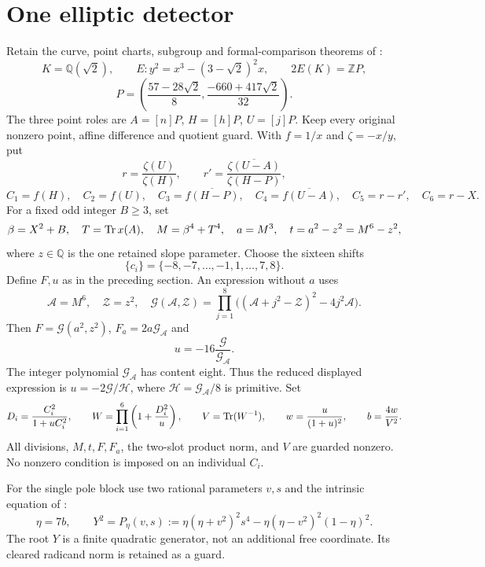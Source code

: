 \documentclass[11pt,a4paper]{article}
\newcommand{\Q}{\mathbb Q}\newcommand{\Z}{\mathbb Z}
\begin{document}
\section{One elliptic detector}

Retain the curve, point charts, subgroup and formal-comparison theorems
of \cite{Conditional,Unit}:
\[
 K=\Q(\sqrt2),\qquad E:y^2=x^3-(3-\sqrt2)^2x,\qquad
 2E(K)=\Z P,
\]
\[
 P=\left(\frac{57-28\sqrt2}{8},
          \frac{-660+417\sqrt2}{32}\right).
\]
The three point roles are $A=[n]P$, $H=[h]P$, $U=[j]P$.
Keep every original nonzero point, affine difference and quotient guard.
With $f=1/x$ and $\zeta=-x/y$, put
\[
 r=\frac{\zeta(U)}{\zeta(H)},\qquad
 r'=\overline{\frac{\zeta(U-A)}{\zeta(H-P)}},
\]
\[
 C_1=f(H),\quad C_2=f(U),\quad
 C_3=\overline{f(H-P)},\quad C_4=\overline{f(U-A)},\quad
 C_5=r-r',\quad C_6=r-X.
\]
For a fixed odd integer $B\ge3$, set
\begin{equation}\label{eq:scale}
 \beta=X^2+B,\quad T=\operatorname{Tr} x(A),\quad
 M=\beta^4+T^4,\quad a=M^3,\quad t=a^2-z^2=M^6-z^2,
\end{equation}
where $z\in\Q$ is the one retained slope parameter.
Choose the sixteen shifts
\[
                  \{c_i\}=\{-8,-7,\ldots,-1,1,\ldots,7,8\}.
\]
Define $F,u$ as in the preceding section. An expression without $a$
uses
\begin{equation}\label{eq:squared-expression}
 \mathcal A=M^6,\quad \mathcal Z=z^2,\quad
 \mathcal G(\mathcal A,\mathcal Z)=
 \prod_{j=1}^8\bigl((\mathcal A+j^2-\mathcal Z)^2-4j^2\mathcal A\bigr).
\end{equation}
Then $F=\mathcal G(a^2,z^2)$, $F_a=2a\mathcal G_{\mathcal A}$ and
\[
                         u=-16\frac{\mathcal G}{\mathcal G_{\mathcal A}}.
\]
The integer polynomial $\mathcal G_{\mathcal A}$ has content eight.
Thus the reduced displayed expression is
$u=-2\mathcal G/\mathcal H$, where
$\mathcal H=\mathcal G_{\mathcal A}/8$ is primitive.
Set
\begin{equation}\label{eq:balanced}
 D_i=\frac{C_i^2}{1+uC_i^2},\qquad
 W=\prod_{i=1}^6\left(1+\frac{D_i^2}{u}\right),\qquad
 V=\operatorname{Tr}(W^{-1}),\qquad
 w=\frac{u}{(1+u)^2},\qquad b=\frac{4w}{V^2}.
\end{equation}
All divisions, $M,t,F,F_a$, the two-slot product norm, and $V$ are
guarded nonzero. No nonzero condition is imposed on an individual $C_i$.

For the single pole block use two rational parameters $v,s$ and the
intrinsic equation of \cite{Intrinsic}:
\begin{equation}\label{eq:pole}
 \eta=7b,\qquad
 Y^2=P_\eta(v,s):=
 \eta(\eta+v^2)^2s^4-\eta(\eta-v^2)^2(1-\eta)^2.
\end{equation}
The root $Y$ is a finite quadratic generator, not an additional free
coordinate. Its cleared radicand norm is retained as a guard.
\end{document}
